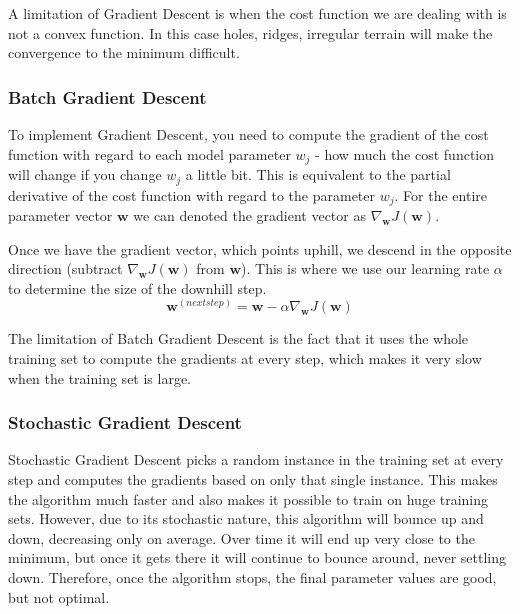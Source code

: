 \documentclass[12pt]{article}
\begin{document}
        A limitation of Gradient Descent is when the cost function we are dealing with is not a convex function. In this
        case holes, ridges, irregular terrain will make the convergence to the minimum difficult.

        \subsubsection{Batch Gradient Descent}
            To implement Gradient Descent, you need to compute the gradient of the cost function with regard to each
            model parameter $w_j$ - how much the cost function will change if you change $w_j$ a little bit. This is
            equivalent to the partial derivative of the cost function with regard to the parameter $w_j$. For the entire
            parameter vector $\boldsymbol{w}$ we can denoted the gradient vector as $\nabla_{\boldsymbol{w}}
            J(\boldsymbol{w})$.

            Once we have the gradient vector, which points uphill, we descend in the opposite direction (subtract
            $\nabla_{\boldsymbol{w}} J(\boldsymbol{w})$ from $\boldsymbol{w}$). This is where we use our learning rate
            $\alpha$ to determine the size of the downhill step.
            $$ \boldsymbol{w}^{(next step)} = \boldsymbol{w} - \alpha \nabla_{\boldsymbol{w}} J(\boldsymbol{w}) $$

            The limitation of Batch Gradient Descent is the fact that it uses the whole training set to compute the
            gradients at every step, which makes it very slow when the training set is large.
        
        \subsubsection{Stochastic Gradient Descent}
            Stochastic Gradient Descent picks a random instance in the training set at every step and computes the
            gradients based on only that single instance. This makes the algorithm much faster and also makes it
            possible to train on huge training sets. However, due to its stochastic nature, this algorithm will bounce
            up and down, decreasing only on average. Over time it will end up very close to the minimum, but once it
            gets there it will continue to bounce around, never settling down. Therefore, once the algorithm stops, the
            final parameter values are good, but not optimal.
\end{document}
